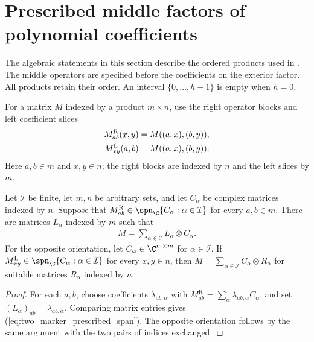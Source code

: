 \section{Prescribed middle factors of polynomial coefficients}

The algebraic statements in this section describe the ordered
products used in \cite[Proposition~5.7]{Arad2016RigorousRG}.
The middle operators are specified before the coefficients on the exterior
factor. All products retain their order.
An interval $\{0,\ldots,h-1\}$ is empty when $h=0$.

For a matrix $M$ indexed by a product $m\times n$, use the right operator
blocks and left coefficient slices
\begin{align}
    M^{\mathrm R}_{ab}(x,y) & =M((a,x),(b,y)),\notag \\
    M^{\mathrm L}_{xy}(a,b) & =M((a,x),(b,y)).
    \label{eq:two_marker_operator_blocks}
\end{align}
Here $a,b\in m$ and $x,y\in n$; the right blocks are indexed by $n$
and the left slices by $m$.

\begin{lemma}
    \label{thm:two_marker_prescribed_span}
    \leanok
    Let $\mathcal I$ be finite, let $m,n$ be arbitrary sets, and let
    $C_\alpha$ be complex matrices indexed by $n$. Suppose that
    $M^{\mathrm R}_{ab}\in\spn_{\C}\{C_\alpha:\alpha\in\mathcal I\}$ for every $a,b\in m$.
    There are matrices $L_\alpha$ indexed by $m$ such that
    \begin{align}
        M=\sum_{\alpha\in\mathcal I}L_\alpha\otimes C_\alpha.
        \label{eq:two_marker_prescribed_span}
    \end{align}
    For the opposite orientation, let $C_\alpha\in\C^{m\times m}$ for
    $\alpha\in\mathcal I$. If
    $M^{\mathrm L}_{xy}\in\spn_{\C}\{C_\alpha:\alpha\in\mathcal I\}$
    for every $x,y\in n$, then
    $M=\sum_{\alpha\in\mathcal I}C_\alpha\otimes R_\alpha$ for suitable
    matrices $R_\alpha$ indexed by $n$.
\end{lemma}
\begin{proof}\leanok
    For each $a,b$, choose coefficients $\lambda_{ab,\alpha}$ with
    $M^{\mathrm R}_{ab}=\sum_\alpha\lambda_{ab,\alpha}C_\alpha$, and set
    $(L_\alpha)_{ab}=\lambda_{ab,\alpha}$. Comparing matrix entries gives
    (\ref{eq:two_marker_prescribed_span}). The opposite orientation follows by
    the same argument with the two pairs of indices exchanged.
\end{proof}

